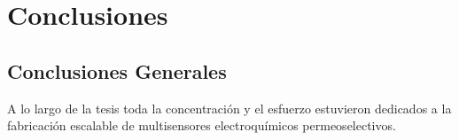  \newcommand{\NoBiblioConc}[1]{
 \ifthenelse{\equal{#1}{verdadero}}{}{}
 \NoBiblioConc{verdadero}}

 	
 \FormatoCapituloUnaLinea
 
 \chapter{Conclusiones}
 \label{chap:Conclusiones}

 \thispagestyle{empty}
	


 \vfill
 \minitoc
 \newpage

\section{Conclusiones Generales}

 A lo largo de la tesis toda la concentración y el esfuerzo estuvieron dedicados a la fabricación escalable de multisensores electroquímicos permeoselectivos. 

